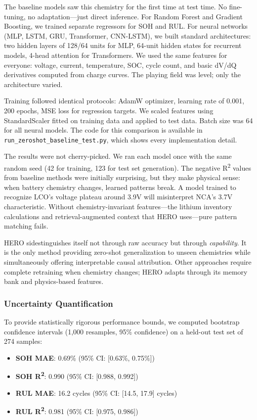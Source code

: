 \documentclass[5p,times,authoryear]{elsarticle}
\begin{document}
The baseline models saw this chemistry for the first time at test time. No fine-tuning, no adaptation---just direct inference. For Random Forest and Gradient Boosting, we trained separate regressors for SOH and RUL. For neural networks (MLP, LSTM, GRU, Transformer, CNN-LSTM), we built standard architectures: two hidden layers of 128/64 units for MLP, 64-unit hidden states for recurrent models, 4-head attention for Transformers. We used the same features for everyone: voltage, current, temperature, SOC, cycle count, and basic dV/dQ derivatives computed from charge curves. The playing field was level; only the architecture varied.

Training followed identical protocols: AdamW optimizer, learning rate of 0.001, 200 epochs, MSE loss for regression targets. We scaled features using StandardScaler fitted on training data and applied to test data. Batch size was 64 for all neural models. The code for this comparison is available in \texttt{run\_zeroshot\_baseline\_test.py}, which shows every implementation detail.

The results were not cherry-picked. We ran each model once with the same random seed (42 for training, 123 for test set generation). The negative R\textsuperscript{2} values from baseline methods were initially surprising, but they make physical sense: when battery chemistry changes, learned patterns break. A model trained to recognize LCO's voltage plateau around 3.9V will misinterpret NCA's 3.7V characteristic. Without chemistry-invariant features---the lithium inventory calculations and retrieval-augmented context that HERO uses---pure pattern matching fails.

HERO sidestinguishes itself not through raw accuracy but through \textit{capability}. It is the only method providing  zero-shot generalization to unseen chemistries while simultaneously offering interpretable causal attribution. Other approaches require complete retraining when chemistry changes; HERO adapts through its memory bank and physics-based features.

\subsubsection{Uncertainty Quantification}

To provide statistically rigorous performance bounds, we computed bootstrap confidence intervals (1,000 resamples, 95\% confidence) on a held-out test set of 274 samples:

\begin{itemize}
\item \textbf{SOH MAE}: 0.69\% (95\% CI: [0.63\%, 0.75\%])
\item \textbf{SOH R\textsuperscript{2}}: 0.990 (95\% CI: [0.988, 0.992])
\item \textbf{RUL MAE}: 16.2 cycles (95\% CI: [14.5, 17.9] cycles)
\item \textbf{RUL R\textsuperscript{2}}: 0.981 (95\% CI: [0.975, 0.986])
\end{itemize}
\end{document}
